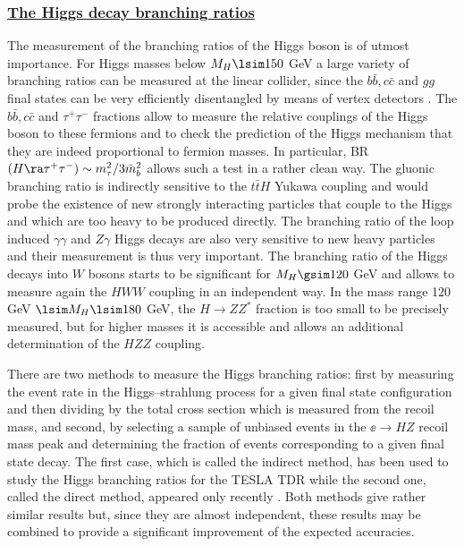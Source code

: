 \subsubsection*{\underline{The Higgs decay branching ratios}}
\vspace*{-1mm}

The measurement of the branching ratios of the Higgs boson
\cite{BRs-early-studies,BRs-NLC,LCWS2,Brient,Barklow,ee-pp-ex,ee-pp-ex-G,ee-pZ-ex,ee-mu-ex
, ee-bb-ex,ee-Hinv-ex} is of utmost importance. For Higgs masses below $M_H
\lsim 150$ GeV a large variety of branching ratios can be measured at the
linear collider, since the $b\bar b, c\bar c$ and $gg$ final states can be very
efficiently disentangled by means of vertex detectors \cite{ZVTOP}. The
$b\bar{b}, c\bar{c}$  and $\tau^+ \tau^-$ fractions allow to measure the
relative couplings of the Higgs boson to these fermions and to check the
prediction of the Higgs mechanism that they are indeed proportional to fermion
masses. In particular, BR$(H \ra \tau^+ \tau^-) \sim m_{\tau}^2/3\bar{m}_b^2$
allows such a test in a rather clean way.  The gluonic branching ratio is
indirectly sensitive to the $t\bar{t}H$ Yukawa coupling and would probe the
existence of new strongly interacting particles that couple to the Higgs and
which are too heavy to be produced directly.  The branching ratio of the loop
induced $\gamma \gamma$ and $Z\gamma$ Higgs decays are also very sensitive to
new heavy particles and their measurement is thus very important. The branching
ratio of the Higgs decays into $W$ bosons starts to be significant for $M_H
\gsim 120$ GeV and allows to measure again the $HWW$ coupling in an independent
way. In the mass range 120 GeV $\lsim M_H \lsim 180$  GeV, the $H \to ZZ^*$
fraction is too small to be precisely measured, but for higher masses it is
accessible and allows an additional determination of the $HZZ$ coupling. \s

There are two methods to measure the Higgs branching ratios: first by measuring
the event rate in the Higgs--strahlung process for a given final state 
configuration and then dividing by the total cross section which is measured
from the recoil mass, and second, by selecting a sample of unbiased events in 
the $\ee \to HZ$ recoil mass peak and determining the fraction of events 
corresponding to a given final state decay. The first case, which is called the 
indirect method, has been used to study the Higgs branching ratios for the
TESLA TDR \cite{TESLA,LCWS2} while the second one, called the direct method,
appeared only recently \cite{Brient}. Both methods give rather similar results
but, since they are almost independent, these results may be combined to 
provide a significant improvement of the expected accuracies. \s
 

